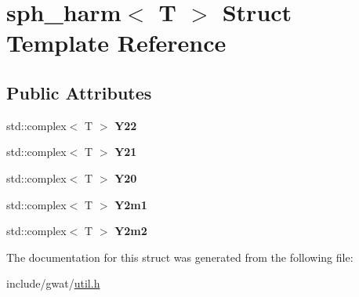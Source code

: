 \hypertarget{structsph__harm}{}\section{sph\+\_\+harm$<$ T $>$ Struct Template Reference}
\label{structsph__harm}
\subsection*{Public Attributes}
\begin{DoxyCompactItemize}
\item 
\mbox{\label{structsph__harm_a0b825cb4dc9e15370d9de94ec290ed2e}} 
std\+::complex$<$ T $>$ {\bfseries Y22}
\item 
\mbox{\label{structsph__harm_a198e9d0138e5a47b585e137aead0e409}} 
std\+::complex$<$ T $>$ {\bfseries Y21}
\item 
\mbox{\label{structsph__harm_a3bf4f2bd1a902fb516f55c9d5f2ab510}} 
std\+::complex$<$ T $>$ {\bfseries Y20}
\item 
\mbox{\label{structsph__harm_ae152cb5736981339cc5a1db219af1d74}} 
std\+::complex$<$ T $>$ {\bfseries Y2m1}
\item 
\mbox{\label{structsph__harm_aaf92ccdf351f773e22c21055deeab849}} 
std\+::complex$<$ T $>$ {\bfseries Y2m2}
\end{DoxyCompactItemize}


The documentation for this struct was generated from the following file\+:\begin{DoxyCompactItemize}
\item 
include/gwat/\hyperlink{util_8h}{util.\+h}\end{DoxyCompactItemize}
